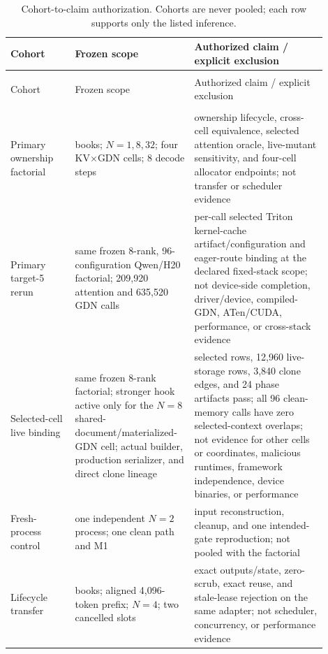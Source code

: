\documentclass{article}
\begin{document}
\begingroup
\footnotesize
\setlength{\LTpre}{0pt}
\setlength{\LTpost}{0pt}
\begin{longtable}{@{}>{\raggedright\arraybackslash}p{0.19\linewidth}>{\raggedright\arraybackslash}p{0.32\linewidth}>{\raggedright\arraybackslash}p{0.39\linewidth}@{}}
  \caption{Cohort-to-claim authorization.  Cohorts are never pooled; each row
  supports only the listed inference.}
  \label{tab:cohorts}\\
  \toprule
  Cohort & Frozen scope & Authorized claim / explicit exclusion \\
  \midrule
  \endfirsthead
  \multicolumn{3}{c}{\textit{Table~\ref{tab:cohorts} continued.}}\\
  \toprule
  Cohort & Frozen scope & Authorized claim / explicit exclusion \\
  \midrule
  \endhead
  \midrule
  \multicolumn{3}{r}{\textit{Continued on next page}}\\
  \endfoot
  \bottomrule
  \endlastfoot
  Primary ownership factorial & 8 books; $N=1,8,32$; four KV$\times$GDN cells; 8 decode steps & ownership lifecycle, cross-cell equivalence, selected attention oracle, live-mutant sensitivity, and four-cell allocator endpoints; not transfer or scheduler evidence \\
  Primary target-5 rerun & same frozen 8-rank, 96-configuration Qwen/H20 factorial; 209,920 attention and 635,520 GDN calls & per-call selected Triton kernel-cache artifact/configuration and eager-route binding at the declared fixed-stack scope; not device-side completion, driver/device, compiled-GDN, ATen/CUDA, performance, or cross-stack evidence \\
  Selected-cell live binding & same frozen 8-rank factorial; stronger hook active only for the $N=8$ shared-document/materialized-GDN cell; actual builder, production serializer, and direct clone lineage & 144 selected rows, 12,960 live-storage rows, 3,840 clone edges, and 24 phase artifacts pass; all 96 clean-memory calls have zero selected-context overlaps; not evidence for other cells or coordinates, malicious runtimes, framework independence, device binaries, or performance \\
  Fresh-process control & one independent $N=2$ process; one clean path and M1 & input reconstruction, cleanup, and one intended-gate reproduction; not pooled with the factorial \\
  Lifecycle transfer & 8 books; aligned 4,096-token prefix; $N=4$; two cancelled slots & exact outputs/state, zero-scrub, exact reuse, and stale-lease rejection on the same adapter; not scheduler, concurrency, or performance evidence \\

\end{longtable}
\end{document}
